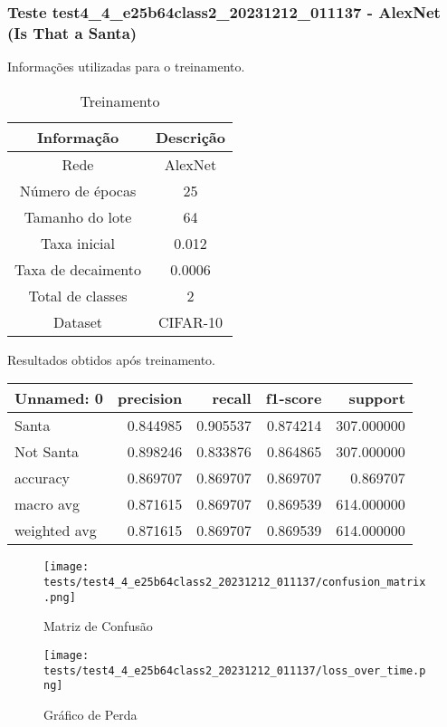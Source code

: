 \subsubsection{Teste test4_4_e25b64class2_20231212_011137 - AlexNet (Is That a Santa)}

Informações utilizadas para o treinamento.

\begin{table}[ht]
   \centering
   \caption{Treinamento}
   \label{tab:modelos}
   \begin{tabular}{| c | c | }
      \hline 
      \textbf{Informação} & \textbf{Descrição} \\
      \hline \hline 
      Rede & AlexNet \\
      \hline
      Número de épocas & 25\\
      \hline
      Tamanho do lote & 64\\
      \hline
      Taxa inicial & 0.012 \\
      \hline
      Taxa de decaimento & 0.0006 \\
      \hline
      Total de classes & 2\\
      \hline
      Dataset & CIFAR-10\\
      \hline
   \end{tabular} 
\end{table}

Resultados obtidos após treinamento.

\begin{tabular}{lrrrr}
\toprule
  Unnamed: 0 &  precision &   recall &  f1-score &    support \\
\midrule
       Santa &   0.844985 & 0.905537 &  0.874214 & 307.000000 \\
   Not Santa &   0.898246 & 0.833876 &  0.864865 & 307.000000 \\
    accuracy &   0.869707 & 0.869707 &  0.869707 &   0.869707 \\
   macro avg &   0.871615 & 0.869707 &  0.869539 & 614.000000 \\
weighted avg &   0.871615 & 0.869707 &  0.869539 & 614.000000 \\
\bottomrule
\end{tabular}


\begin{figure}[ht]
 \begin{center}
   \texttt{[image: tests/test4\_4\_e25b64class2\_20231212\_011137/confusion\_matrix.png]}
  \caption{Matriz de Confusão}
  \label{fig:fig03}
 \end{center}
\end{figure}

\begin{figure}[ht]
 \begin{center}
   \texttt{[image: tests/test4\_4\_e25b64class2\_20231212\_011137/loss\_over\_time.png]}
  \caption{Gráfico de Perda}
  \label{fig:fig04}
 \end{center}
\end{figure}

